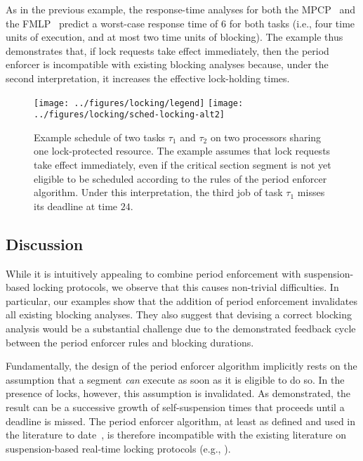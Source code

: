 As in the previous example,  the response-time analyses for both the MPCP~\cite{Br:13,LNR:09} and the   FMLP~\cite{Br:13} predict a worst-case response time of $6$ for both tasks (i.e., four time units of execution, and at most two time units of blocking). The example thus demonstrates that, if lock requests take effect immediately, then the period enforcer is incompatible with existing blocking analyses because, under the second interpretation, it increases the effective lock-holding times.


\begin{figure}[t]
  \centering
  \texttt{[image: ../figures/locking/legend]}
  \texttt{[image: ../figures/locking/sched-locking-alt2]}
  \caption{Example schedule of two tasks $\tau_1$ and $\tau_2$ on two processors sharing one lock-protected resource. The example assumes that lock requests take effect immediately, even if the critical section segment is not yet eligible to be scheduled according to the rules of the period enforcer algorithm. Under this interpretation, the third job of task $\tau_1$ misses its deadline at time $24$.}
  \label{fig:locking-alt2}
  \end{figure}


\subsection{Discussion}

While it is intuitively appealing to combine period enforcement with suspension-based locking protocols, we observe that this causes non-trivial difficulties. In particular, our examples show that the addition of period enforcement invalidates all existing blocking analyses. They also suggest that devising a correct blocking analysis would be a substantial challenge due to the demonstrated feedback cycle between the period enforcer rules and blocking durations. 


Fundamentally, the design of the period enforcer algorithm implicitly rests on the assumption that a segment \emph{can} execute as soon as it is eligible to do so. In the presence of locks, however, this assumption is invalidated. As demonstrated, the result can be a successive growth of self-suspension times that proceeds until a deadline is missed.  The period enforcer algorithm, at least as defined and used in the literature to date~\cite{Raj:suspension1991,Raj:91}, is therefore incompatible with the existing literature on suspension-based real-time locking protocols (e.g., \cite{Raj:91,Lak:11,LNR:09,BLBA:07,Br:13}). 


